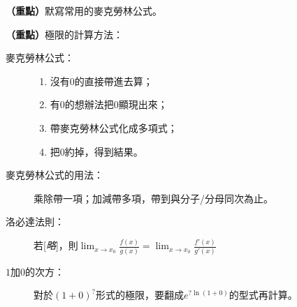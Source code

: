 \documentclass[12pt, addpoints]{exam}
\def \important{\textbf{（重點）}}
\begin{document}
\begin{questions} %

\question
\important 默寫常用的麥克勞林公式。

\newpage %

\question
\important 極限的計算方法：
\begin{description}
    \item[麥克勞林公式：] 
        \begin{enumerate}
            \item
            沒有$0$的直接帶進去算；
            \item
            有$0$的想辦法把$0$顯現出來；
            \item
            帶麥克勞林公式化成多項式；
            \item
            把$0$約掉，得到結果。
        \end{enumerate}
    \item[麥克勞林公式的用法：] 乘除帶一項；加減帶多項，帶到與分子/分母同次為止。
    \item[洛必達法則：] 若[\textit{略}]，則$\displaystyle \lim_{x \to x_0} \frac{f(x)}{g(x)} = \lim_{x \to x_0} \frac{f'(x)}{g'(x)}$
    \item[$1$加$0$的次方：] 對於$\displaystyle (1+0)^?$形式的極限，要翻成$\displaystyle e^{? \ln{(1+0)}}$的型式再計算。
\end{description}


\end{questions}
\end{document}
